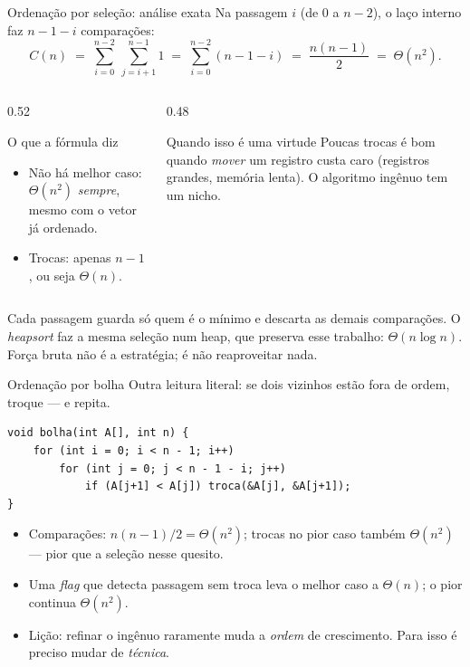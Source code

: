 \documentclass[aspectratio=169]{beamer}
\begin{document}
\begin{frame}{Ordenação por seleção: análise exata}
  Na passagem $i$ (de $0$ a $n-2$), o laço interno faz $n-1-i$ comparações:
  \[
    C(n) \;=\; \sum_{i=0}^{n-2}\ \sum_{j=i+1}^{n-1} 1
          \;=\; \sum_{i=0}^{n-2} (n-1-i)
          \;=\; \frac{n(n-1)}{2} \;=\; \Theta(n^2).
  \]
  \vspace{-3mm}
  \begin{columns}[T]
    \begin{column}{0.52\textwidth}
      \begin{block}{O que a fórmula diz}
        \begin{itemize}
          \item Não há melhor caso: $\Theta(n^2)$ \emph{sempre}, mesmo com o
            vetor já ordenado.
          \item Trocas: apenas $n-1$, ou seja $\Theta(n)$.
        \end{itemize}
      \end{block}
    \end{column}
    \begin{column}{0.48\textwidth}
      \begin{exampleblock}{Quando isso é uma virtude}
        Poucas trocas é bom quando \emph{mover} um registro custa caro
        (registros grandes, memória lenta). O algoritmo ingênuo tem um nicho.
      \end{exampleblock}
    \end{column}
  \end{columns}

  \footnotesize
  Cada passagem guarda só quem é o mínimo e descarta as demais comparações. O
  \emph{heapsort} faz a mesma seleção num heap, que preserva esse trabalho:
  $\Theta(n\log n)$. Força bruta não é a estratégia; é não reaproveitar nada.
\end{frame}

\begin{frame}[fragile]{Ordenação por bolha}
  Outra leitura literal: se dois vizinhos estão fora de ordem, troque --- e repita.

\begin{lstlisting}
void bolha(int A[], int n) {
    for (int i = 0; i < n - 1; i++)
        for (int j = 0; j < n - 1 - i; j++)
            if (A[j+1] < A[j]) troca(&A[j], &A[j+1]);
}
\end{lstlisting}

  \begin{itemize}
    \item Comparações: $n(n-1)/2 = \Theta(n^2)$; trocas no pior caso também
      $\Theta(n^2)$ --- pior que a seleção nesse quesito.
    \item Uma \emph{flag} que detecta passagem sem troca leva o melhor caso a
      $\Theta(n)$; o pior continua $\Theta(n^2)$.
    \item Lição: refinar o ingênuo raramente muda a \emph{ordem} de crescimento.
      Para isso é preciso mudar de \emph{técnica}.
  \end{itemize}
\end{frame}
\end{document}
